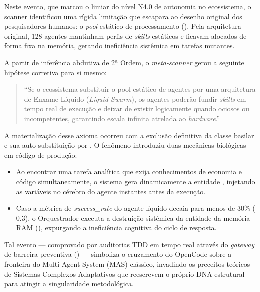 Neste evento, que marcou o limiar do nível N4.0 de autonomia no ecossistema, o scanner identificou uma rígida limitação que escapara ao desenho original dos pesquisadores humanos: o \textit{pool} estático de processamento (). Pela arquitetura original, 128 agentes mantinham perfis de \textit{skills} estáticos e ficavam alocados de forma fixa na memória, gerando ineficiência sistêmica em tarefas mutantes.

A partir de inferência abdutiva de 2ª Ordem, o \textit{meta-scanner} gerou a seguinte hipótese corretiva para si mesmo: 
\begin{quote}
``Se o ecossistema substituir o pool estático de agentes por uma arquitetura de Enxame Líquido (\textit{Liquid Swarm}), os agentes poderão fundir \textit{skills} em tempo real de execução e deixar de existir logicamente quando ociosos ou incompetentes, garantindo escala infinita atrelada ao \textit{hardware}.''
\end{quote}

A materialização desse axioma ocorreu com a exclusão definitiva da classe basilar  e sua auto-substituição por . O fenômeno introduziu duas mecânicas biológicas em código de produção:
\begin{itemize}
    \item {} Ao encontrar uma tarefa analítica que exija conhecimentos de economia e código simultaneamente, o sistema gera dinamicamente a entidade , injetando as variáveis no cérebro do agente instantes antes da execução.
    \item {} Caso a métrica de \textit{success\_rate} do agente líquido decaia para menos de $30\%$ ($0.3$), o Orquestrador executa a destruição sistêmica da entidade da memória RAM (), expurgando a ineficiência cognitiva do ciclo de resposta.
\end{itemize}

Tal evento — comprovado por auditorias TDD em tempo real através do \textit{gateway} de barreira preventiva () — simboliza o cruzamento do OpenCode sobre a fronteira do Multi-Agent System (MAS) clássico, invadindo os preceitos teóricos de Sistemas Complexos Adaptativos que reescrevem o próprio DNA estrutural para atingir a singularidade metodológica.

